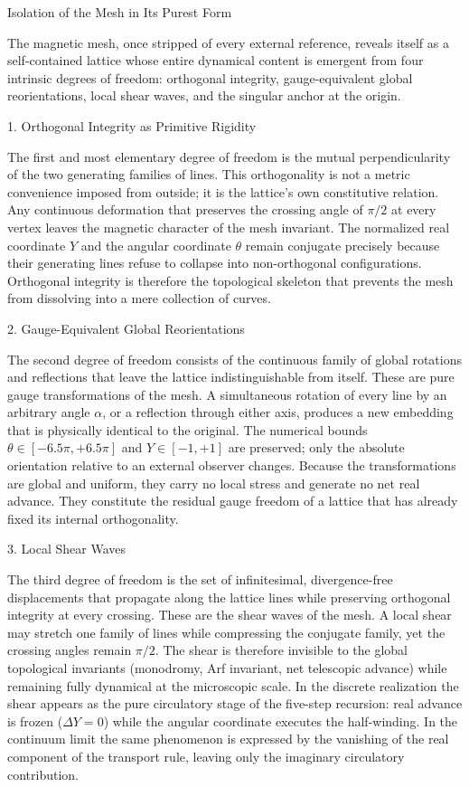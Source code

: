 Isolation of the Mesh in Its Purest Form

The magnetic mesh, once stripped of every external reference, reveals itself as a self-contained lattice whose entire dynamical content is emergent from four intrinsic degrees of freedom: orthogonal integrity, gauge-equivalent global reorientations, local shear waves, and the singular anchor at the origin.

1. Orthogonal Integrity as Primitive Rigidity

The first and most elementary degree of freedom is the mutual perpendicularity of the two generating families of lines. This orthogonality is not a metric convenience imposed from outside; it is the lattice’s own constitutive relation. Any continuous deformation that preserves the crossing angle of \(\pi/2\) at every vertex leaves the magnetic character of the mesh invariant. The normalized real coordinate \(Y\) and the angular coordinate \(\theta\) remain conjugate precisely because their generating lines refuse to collapse into non-orthogonal configurations. Orthogonal integrity is therefore the topological skeleton that prevents the mesh from dissolving into a mere collection of curves.

2. Gauge-Equivalent Global Reorientations

The second degree of freedom consists of the continuous family of global rotations and reflections that leave the lattice indistinguishable from itself. These are pure gauge transformations of the mesh. A simultaneous rotation of every line by an arbitrary angle \(\alpha\), or a reflection through either axis, produces a new embedding that is physically identical to the original. The numerical bounds \(\theta\in[-6.5\pi,+6.5\pi]\) and \(Y\in[-1,+1]\) are preserved; only the absolute orientation relative to an external observer changes. Because the transformations are global and uniform, they carry no local stress and generate no net real advance. They constitute the residual gauge freedom of a lattice that has already fixed its internal orthogonality.

3. Local Shear Waves

The third degree of freedom is the set of infinitesimal, divergence-free displacements that propagate along the lattice lines while preserving orthogonal integrity at every crossing. These are the shear waves of the mesh. A local shear may stretch one family of lines while compressing the conjugate family, yet the crossing angles remain \(\pi/2\). The shear is therefore invisible to the global topological invariants (monodromy, Arf invariant, net telescopic advance) while remaining fully dynamical at the microscopic scale. In the discrete realization the shear appears as the pure circulatory stage of the five-step recursion: real advance is frozen (\(\Delta Y=0\)) while the angular coordinate executes the half-winding. In the continuum limit the same phenomenon is expressed by the vanishing of the real component of the transport rule, leaving only the imaginary circulatory contribution.

